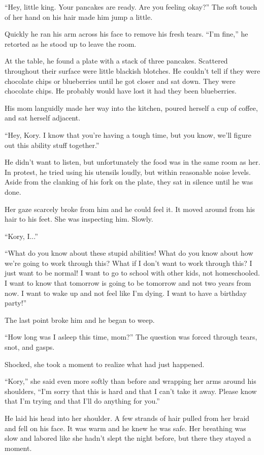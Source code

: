 ``Hey, little king. Your pancakes are ready. Are you feeling okay?'' The soft touch of her hand on his hair made him jump a little.

Quickly he ran his arm across his face to remove his fresh tears. ``I'm fine,'' he retorted as he stood up to leave the room.

At the table, he found a plate with a stack of three pancakes. Scattered throughout their surface were little blackish blotches. He couldn't tell if they were chocolate chips or blueberries until he got closer and sat down. They were chocolate chips. He probably would have lost it had they been blueberries.

His mom languidly made her way into the kitchen, poured herself a cup of coffee, and sat herself adjacent.

``Hey, Kory. I know that you're having a tough time, but you know, we'll figure out this ability stuff together.''

He didn't want to listen, but unfortunately the food was in the same room as her. In protest, he tried using his utensils loudly, but within reasonable noise levels. Aside from the clanking of his fork on the plate, they sat in silence until he was done.

Her gaze scarcely broke from him and he could feel it. It moved around from his hair to his feet. She was inspecting him. Slowly.

``Kory, I...''

``What do you know about these stupid abilities! What do you know about how we're going to work through this? What if I don't want to work through this? I just want to be normal! I want to go to school with other kids, not homeschooled. I want to know that tomorrow is going to be tomorrow and not two years from now. I want to wake up and not feel like I'm dying. I want to have a birthday party!''

The last point broke him and he began to weep.

``How long was I asleep this time, mom?'' The question was forced through tears, snot, and gasps.

Shocked, she took a moment to realize what had just happened.

``Kory,'' she said even more softly than before and wrapping her arms around his shoulders, ``I'm sorry that this is hard and that I can't take it away. Please know that I'm trying and that I'll do anything for you.''

He laid his head into her shoulder. A few strands of hair pulled from her braid and fell on his face. It was warm and he knew he was safe. Her breathing was slow and labored like she hadn't slept the night before, but there they stayed a moment.

